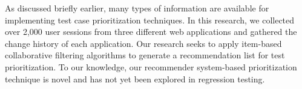 As discussed briefly earlier, many types of information are available 
for implementing test case prioritization techniques.
In this research, we collected over 2,000 user sessions from 
three different web applications and gathered the change history of each application. 
Our research seeks to apply item-based collaborative filtering algorithms 
to generate a recommendation list for test prioritization.
To our knowledge, our recommender system-based prioritization technique is novel 
and has not yet been explored in regression testing.

